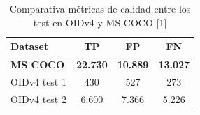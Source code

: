 \begin{table}[ht]
\centering
\caption{Comparativa métricas de calidad entre los test en OIDv4 y MS COCO [1]}
\label{tab:comparativa-metricas1}
\begin{tabular}{lccc}
\hline
\textbf{Dataset}                   & \textbf{TP}          & \textbf{FP}          & \textbf{FN}          \\ \hline
\textbf{MS COCO}                   & \textbf{22.730}      & \textbf{10.889}      & \textbf{13.027}      \\
OIDv4 test 1                       & 430                  & 527                  & 273                  \\
OIDv4 test 2                       & 6.600                & 7.366                & 5.226                \\ \hline
\end{tabular}
\end{table}

